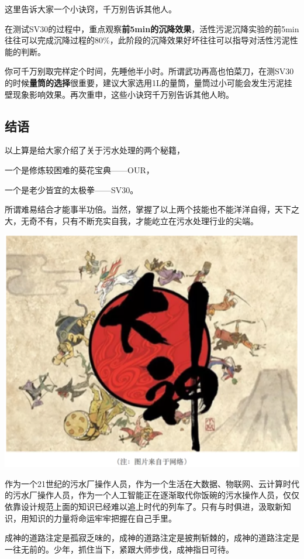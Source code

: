\documentclass[]{book}
\begin{document}
这里告诉大家一个小诀窍，千万别告诉其他人。

在测试SV30的过程中，重点观察\textbf{前5min的沉降效果}，活性污泥沉降实验的前5min往往可以完成沉降过程的80\%，此阶段的沉降效果好坏往往可以指导对活性污泥性能的判断。

你可千万别取完样定个时间，先睡他半小时。所谓武功再高也怕菜刀，在测SV30的时候\textbf{量筒的选择}很重要，建议大家选用1L的量筒，量筒过小可能会发生污泥挂壁现象影响效果。再次重申，这些小诀窍千万别告诉其他人哟。

\subsection{结语}\label{-2}

以上算是给大家介绍了关于污水处理的两个秘籍，

一个是修炼较困难的葵花宝典------OUR，

一个是老少皆宜的太极拳------SV30。

所谓难易结合才能事半功倍。当然，掌握了以上两个技能也不能洋洋自得，天下之大，无奇不有，只有不断充实自我，才能屹立在污水处理行业的尖端。

\includegraphics[width=6.67in]{images/os4}

作为一个21世纪的污水厂操作人员，作为一个生活在大数据、物联网、云计算时代的污水厂操作人员，作为一个人工智能正在逐渐取代你饭碗的污水操作人员，仅仅依靠设计规范上面的知识已经难以追上时代的列车了。只有与时俱进，汲取新知识，用知识的力量将命运牢牢把握在自己手里。

成神的道路注定是孤寂乏味的，成神的道路注定是披荆斩棘的，成神的道路注定是一往无前的。少年，抓住当下，紧跟大师步伐，成神指日可待。
\end{document}

